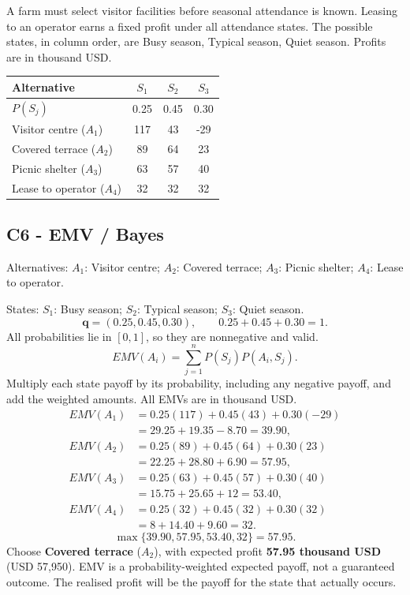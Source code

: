 \clearpage
{}
A farm must select visitor facilities before seasonal attendance is known. Leasing to an operator earns a fixed profit under all attendance states. The possible states, in column order, are Busy season, Typical season, Quiet season. Profits are in thousand USD.
\begin{center}
\begin{tabular}{@{}lccc@{}}\toprule
Alternative & $S_1$ & $S_2$ & $S_3$\\\midrule
$P(S_j)$ & 0.25 & 0.45 & 0.30\\
Visitor centre ($A_1$) & 117 & 43 & -29\\
Covered terrace ($A_2$) & 89 & 64 & 23\\
Picnic shelter ($A_3$) & 63 & 57 & 40\\
Lease to operator ($A_4$) & 32 & 32 & 32\\
\bottomrule\end{tabular}
\end{center}
\subsection*{C6 - EMV / Bayes }
\label{sol:farm-visitor-facilities-c6}
Alternatives: $A_1$: Visitor centre; $A_2$: Covered terrace; $A_3$: Picnic shelter; $A_4$: Lease to operator.\par
States: $S_1$: Busy season; $S_2$: Typical season; $S_3$: Quiet season.
\[\boldsymbol{q}=(0.25,0.45,0.30),\qquad 0.25+0.45+0.30=1.\]
All probabilities lie in $[0,1]$, so they are nonnegative and valid.
\[EMV(A_i)=\sum_{j=1}^{n}P(S_j)P(A_i,S_j).\]
Multiply each state payoff by its probability, including any negative payoff, and add the weighted amounts. All EMVs are in thousand USD.
\begin{align*}
EMV(A_1)&=0.25(117)+0.45(43)+0.30(-29)\\&=29.25+19.35-8.70=39.90,\\
EMV(A_2)&=0.25(89)+0.45(64)+0.30(23)\\&=22.25+28.80+6.90=57.95,\\
EMV(A_3)&=0.25(63)+0.45(57)+0.30(40)\\&=15.75+25.65+12=53.40,\\
EMV(A_4)&=0.25(32)+0.45(32)+0.30(32)\\&=8+14.40+9.60=32.
\end{align*}
\[\max\{39.90,57.95,53.40,32\}=57.95.\]
Choose \textbf{Covered terrace} ($A_2$), with expected profit \textbf{57.95 thousand USD} (USD 57,950). EMV is a probability-weighted expected payoff, not a guaranteed outcome. The realised profit will be the payoff for the state that actually occurs.
\par\vspace{4mm}

